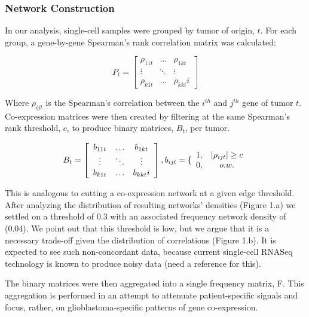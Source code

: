 \documentclass[11pt,twoside,a4paper]{article}
\begin{document}
\subsubsection{Network Construction }
In our analysis, single-cell samples were grouped by tumor of origin, $t$. For each group, a gene-by-gene Spearman’s rank correlation matrix was calculated: 

\begin{equation}\label{equation3}
 P_t = \left[ \begin{array}{ccc}
\rho_{11t} & \ldots & \rho_{1kt} \\
\vdots & \ddots & \vdots \\
\rho_{k1t} & \ldots & \rho_{kkt}i \end{array} \right]
\end{equation}

Where $\rho_{ijt}$ is the Spearman’s correlation between the $i^{th}$ and $j^{th}$ gene of tumor $t$. Co-expression matrices were then created by filtering at the same Spearman’s rank threshold, $c$, to produce binary matrices, $B_t$, per tumor. 

\begin{equation}\label{equation4}
B_t = \left[ \begin{array}{ccc}
b_{11t} & \ldots & b_{1kt} \\
\vdots & \ddots & \vdots \\
b_{k1t} & \ldots & b_{kkt}i \end{array} \right] \\
, b_{ijt}=\{ \begin{array} {cc}
1, & \vert\rho_{ijt}\vert\ge c \\
0, & o.w. \\
\end{array}
\end{equation}

This is analogous to cutting a co-expression network at a given edge threshold. After analyzing the distribution of resulting networks’ densities (Figure 1.a) we settled on a threshold of 0.3 with an associated frequency network density of (0.04). We point out that this threshold is low, but we argue that it is a necessary trade-off given the distribution of correlations (Figure 1.b). It is expected to see such non-concordant data, because current single-cell RNASeq technology is known to produce noisy data (need a reference for this).

The binary matrices were then aggregated into a single frequency matrix, F. This aggregation is performed in an attempt to attenuate patient-specific signals and focus, rather, on glioblastoma-specific patterns of gene co-expression.
\end{document}
